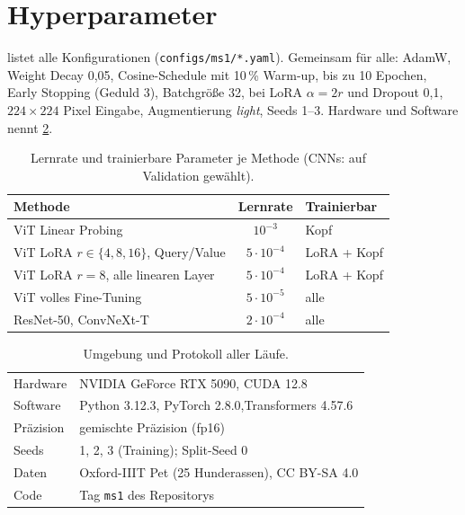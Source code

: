 \clearpage
\setcounter{page}{1}
\appendix

\section{Hyperparameter}
\label{sec:hyperparameters}
 listet alle Konfigurationen (\texttt{configs/ms1/*.yaml}). Gemeinsam für alle: AdamW,
Weight Decay 0,05, Cosine-Schedule mit 10\,\% Warm-up, bis zu 10 Epochen, Early Stopping (Geduld 3),
Batchgröße 32, bei LoRA $\alpha=2r$ und Dropout 0,1, $224\times224$ Pixel Eingabe, Augmentierung \emph{light}, Seeds 1--3. Hardware und Software
nennt \cref{tab:repro}.

\begin{table}[h]
  \centering
  \caption{Lernrate und trainierbare Parameter je Methode (CNNs: auf Validation gewählt).}
  \label{tab:hyper}
  \small
  \begin{tabular}{p{3.7cm}cl}
    \toprule
    Methode & Lernrate & Trainierbar \\
    \midrule
    ViT Linear Probing & $10^{-3}$ & Kopf \\
    ViT LoRA $r\in\{4,8,16\}$, Query/Value & $5\cdot10^{-4}$ & LoRA + Kopf \\
    ViT LoRA $r=8$, alle linearen Layer & $5\cdot10^{-4}$ & LoRA + Kopf \\
    ViT volles Fine-Tuning & $5\cdot10^{-5}$ & alle \\
    ResNet-50, ConvNeXt-T & $2\cdot10^{-4}$ & alle \\
    \bottomrule
  \end{tabular}
\end{table}

\begin{table}[h]
  \centering
  \caption{Umgebung und Protokoll aller Läufe.}
  \label{tab:repro}
  \small
  \begin{tabular}{lp{5.6cm}}
    \toprule
    Hardware & NVIDIA GeForce RTX 5090, CUDA 12.8 \\
    Software & Python 3.12.3, PyTorch 2.8.0,\newline Transformers 4.57.6 \\
    Präzision & gemischte Präzision (fp16) \\
    Seeds & 1, 2, 3 (Training); Split-Seed 0 \\
    Daten & Oxford-IIIT Pet (25 Hunderassen), CC BY-SA 4.0 \\
    Code & Tag \texttt{ms1} des Repositorys \\
    \bottomrule
  \end{tabular}
\end{table}

